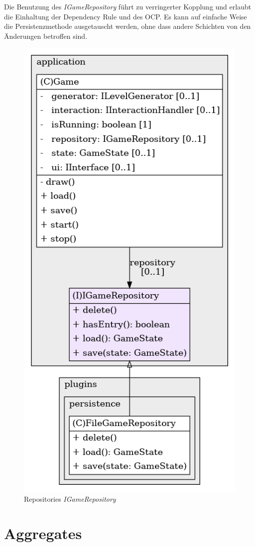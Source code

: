 Die Benutzung des \textit{IGameRepository} führt zu verringerter
Kopplung und erlaubt die Einhaltung der Dependency Rule und des OCP.
Es kann auf einfache Weise die Persistenzmethode ausgetauscht werden,
ohne dass andere Schichten von den Änderungen betroffen sind.

\vspace{0.5cm}
\begin{figure}[H]
    \centering
    \includegraphics[width=0.3\linewidth]{Bilder/Visualisierung/IGameRepository_structure.png}
    \caption{Repositories \textit{IGameRepository}}
\end{figure}

\section{Aggregates}